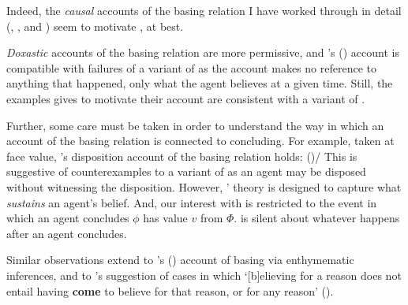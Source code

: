 \begin{note}
{    Indeed, the \emph{causal} accounts of the basing relation I have worked through in detail (\cite{Moser:1989tv}, \cite{Ye:2020ux}, and \cite{Turri:2011aa}) seem to motivate \issueInclusion{}, at best.

    \emph{Doxastic} accounts of the basing relation are more permissive, and \citeauthor{Tolliver:1982us}'s (\citeyear{Tolliver:1982us}) account is compatible with failures of a variant of \issueInclusion{} as the account makes no reference to anything that happened, only what the agent believes at a given time.
    Still, the examples \citeauthor{Tolliver:1982us} gives to motivate their account are consistent with a variant of \issueInclusion{}.

    Further, some care must be taken in order to understand the way in which an account of the basing relation is connected to concluding.
    For example, taken at face value, \citeauthor{Evans:2013tw}'s disposition account of the basing relation holds:
     (\citeyear[2952]{Evans:2013tw})/
  This is suggestive of counterexamples to a variant of \issueInclusion{} as an agent may be disposed without witnessing the disposition.
  However, \citeauthor{Evans:2013tw}' theory is designed to capture what \emph{sustains} an agent's belief.%
  And, our interest with \issueInclusion{} is restricted to the event in which an agent concludes \(\phi\) has value \(v\) from \(\Phi\).
  \issueInclusion{} is silent about whatever happens after an agent concludes.

  Similar observations extend to \citeauthor{Moretti:2019wx}'s (\citeyear{Moretti:2019wx}) account of basing via enthymematic inferences, and to  \citeauthor{Audi:1986to}'s suggestion of cases in which `[b]elieving for a reason does not entail having \textbf{come} to believe for that reason, or for any reason' (\citeyear[32--33]{Audi:1986to}).
  }
\end{note}

